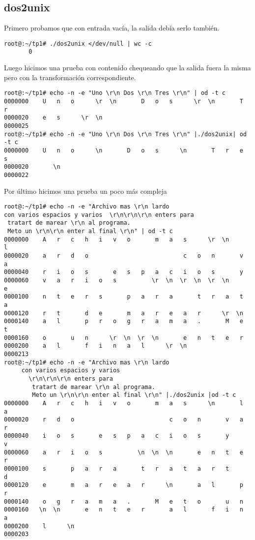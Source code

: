 \documentclass[a4paper,11pt]{article}
\begin{document}
\subsection{dos2unix}
Primero probamos que con entrada vac\'ia, la salida deb\'ia serlo tambi\'en.
\begin{verbatim}
root@:~/tp1# ./dos2unix </dev/null | wc -c
       0
\end{verbatim}

Luego hicimos una prueba con contenido chequeando que la salida fuera la misma pero con la transformaci\'on correspondiente.
\begin{verbatim}
root@:~/tp1# echo -n -e "Uno \r\n Dos \r\n Tres \r\n" | od -t c
0000000    U   n   o      \r  \n       D   o   s      \r  \n       T   r
0000020    e   s      \r  \n                                            
0000025
root@:~/tp1# echo -n -e "Uno \r\n Dos \r\n Tres \r\n" |./dos2unix| od -t c
0000000    U   n   o      \n       D   o   s      \n       T   r   e   s
0000020       \n                                                        
0000022
\end{verbatim}

Por \'ultimo hicimos una prueba un poco m\'as compleja
\begin{verbatim}
root@:~/tp1# echo -n -e "Archivo mas \r\n lardo      
con varios espacios y varios  \r\n\r\n\r\n enters para
 tratart de marear \r\n al programa. 
 Meto un \r\n\r\n enter al final \r\n" | od -t c
0000000    A   r   c   h   i   v   o       m   a   s      \r  \n       l
0000020    a   r   d   o                           c   o   n       v   a
0000040    r   i   o   s       e   s   p   a   c   i   o   s       y    
0000060    v   a   r   i   o   s          \r  \n  \r  \n  \r  \n       e
0000100    n   t   e   r   s       p   a   r   a       t   r   a   t   a
0000120    r   t       d   e       m   a   r   e   a   r      \r  \n    
0000140    a   l       p   r   o   g   r   a   m   a   .       M   e   t
0000160    o       u   n      \r  \n  \r  \n       e   n   t   e   r    
0000200    a   l       f   i   n   a   l      \r  \n                    
0000213
root@:~/tp1# echo -n -e "Archivo mas \r\n lardo 
     con varios espacios y varios
       \r\n\r\n\r\n enters para
        tratart de marear \r\n al programa. 
        Meto un \r\n\r\n enter al final \r\n" |./dos2unix |od -t c
0000000    A   r   c   h   i   v   o       m   a   s      \n       l   a
0000020    r   d   o                           c   o   n       v   a   r
0000040    i   o   s       e   s   p   a   c   i   o   s       y       v
0000060    a   r   i   o   s          \n  \n  \n       e   n   t   e   r
0000100    s       p   a   r   a       t   r   a   t   a   r   t       d
0000120    e       m   a   r   e   a   r      \n       a   l       p   r
0000140    o   g   r   a   m   a   .       M   e   t   o       u   n    
0000160   \n  \n       e   n   t   e   r       a   l       f   i   n   a
0000200    l      \n                                                    
0000203
\end{verbatim}
\end{document}
